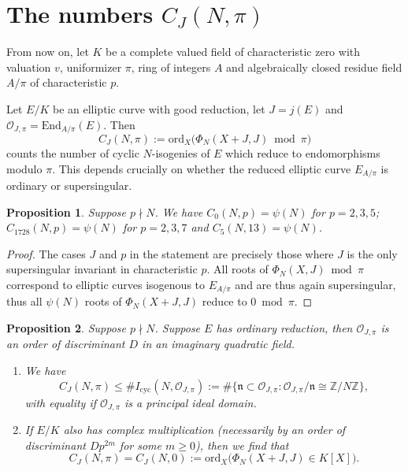 \documentclass[11pt]{amsart}
\newtheorem{prop}{Proposition}[section]
\theoremstyle{definition}
\newcommand{\End} {{\mathrm{End}}}
\newcommand{\ord}{\mathrm{ord}}
\def\BZ{\mathbb{Z}}
\def\CO{\mathcal{O}}
\begin{document}
\section{The numbers $C_J(N,\pi)$}
From now on, let $K$ be a complete valued field of characteristic zero with valuation $v$, uniformizer $\pi$, ring of integers $A$ and algebraically closed residue field $A/\pi$ of characteristic $p$.

Let $E/K$ be an elliptic curve with good reduction, let $J = j(E)$ and $\CO_{J,\pi} = \End_{A/\pi}(E)$. Then 
\[
C_J(N,\pi) := \ord_X\big(\Phi_N(X+J, J) \bmod \pi\big)
\] 
counts the number of cyclic $N$-isogenies of $E$ which reduce to endomorphisms modulo $\pi$. This depends crucially on whether the reduced elliptic curve $E_{A/\pi}$ is ordinary or supersingular.

\begin{prop}\label{prop:fullpsi}
    Suppose $p\nmid N$. 
    We have $C_0(N,p) = \psi(N)$ for $p=2,3,5$; 
    $C_{1728}(N,p) = \psi(N)$ for $p=2,3,7$ and
    $C_5(N,13) = \psi(N)$.
\end{prop}

\begin{proof}
    The cases $J$ and $p$ in the statement are precisely those where $J$ is the only supersingular invariant in characteristic $p$. All roots of $\Phi_N(X, J) \bmod \pi$ correspond to elliptic curves isogenous to $E_{A/\pi}$ and are thus again supersingular, thus all $\psi(N)$ roots of $\Phi_N(X+J, J)$ reduce to $0 \bmod \pi$.
\end{proof}

\begin{prop}\label{ordinary}
    Suppose $p\nmid N$. Suppose $E$ has ordinary reduction, then $\CO_{J,\pi}$ is an order of discriminant $D$ in an imaginary quadratic field. 
    \begin{enumerate}
        \item  We have 
        \[
        C_J(N,\pi) \leq \#I_{\mathrm{cyc}}(N,\CO_{J,\pi})
        :=
        \#\{\mathfrak n\subset \CO_{J,\pi} :
                \CO_{J,\pi}/\mathfrak n\cong \BZ/N\BZ\},
        \]
        with equality if $\CO_{J,\pi}$ is a principal ideal domain.
        
        \item If $E/K$ also has complex multiplication (necessarily by an order of discriminant $Dp^{2m}$ for some $m \geq 0$), then we find that
        \[
        C_J(N,\pi) = C_J(N,0) := \ord_{X}\big(\Phi_N(X+J, J) \in K[X]\big).
        \]
    \end{enumerate}
\end{prop}
\end{document}
